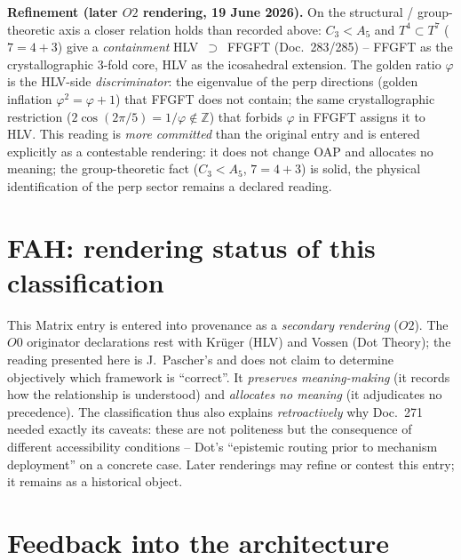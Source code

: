\medskip\noindent\textbf{Refinement (later $O2$ rendering, 19 June 2026).} On the structural / group-theoretic axis a closer relation holds than recorded above: $C_3<A_5$ and $T^4\subset T^7$ ($7=4+3$) give a \emph{containment} HLV~$\supset$~FFGFT (Doc.~283/285) -- FFGFT as the crystallographic $3$-fold core, HLV as the icosahedral extension. The golden ratio $\varphi$ is the HLV-side \emph{discriminator}: the eigenvalue of the perp directions (golden inflation $\varphi^2=\varphi+1$) that FFGFT does not contain; the same crystallographic restriction ($2\cos(2\pi/5)=1/\varphi\notin\mathbb{Z}$) that forbids $\varphi$ in FFGFT assigns it to HLV. This reading is \emph{more committed} than the original entry and is entered explicitly as a contestable rendering: it does not change OAP and allocates no meaning; the group-theoretic fact ($C_3<A_5$, $7=4+3$) is solid, the physical identification of the perp sector remains a declared reading.

\section{FAH: rendering status of this classification}

This Matrix entry is entered into provenance as a \emph{secondary rendering} ($O2$). The $O0$ originator
declarations rest with Krüger (HLV) and Vossen (Dot Theory); the reading presented here is J.~Pascher's and does
not claim to determine objectively which framework is \enquote{correct}. It \emph{preserves meaning-making} (it
records how the relationship is understood) and \emph{allocates no meaning} (it adjudicates no precedence). The
classification thus also explains \emph{retroactively} why Doc.~271 needed exactly its caveats: these are not
politeness but the consequence of different accessibility conditions -- Dot's \enquote{epistemic routing prior to
mechanism deployment} on a concrete case. Later renderings may refine or contest this entry; it remains as a
historical object.

\section{Feedback into the architecture}

